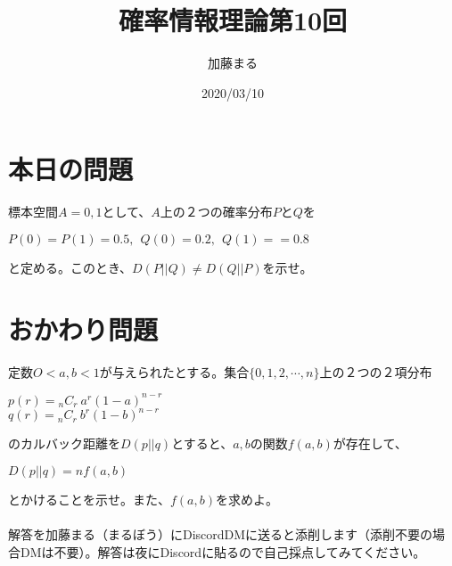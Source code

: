 \documentclass[a4j,uplatex,dvipdfmx]{jsarticle}
\title{確率情報理論第10回}
\author{加藤まる}
\date{2020/03/10}
\begin{document}
\maketitle

\section*{本日の問題}
標本空間$A={0,1}$として、$A$上の２つの確率分布$PとQ$を
\begin{center}
  $P(0)=P(1)=0.5,~~Q(0)=0.2,~~Q(1)==0.8$
\end{center}
と定める。このとき、$D(P||Q)\neq D(Q||P)$を示せ。


\section*{おかわり問題}
定数$O<a,b<1$が与えられたとする。集合$\{ 0,1,2,\cdots ,n \}$上の２つの２項分布
\begin{center}
  $p(r) = {}_nC_r~a^r (1-a)^{n-r}$\\
  $q(r) = {}_nC_r~b^r (1-b)^{n-r}$\\
\end{center}
のカルバック距離を$D(p||q)$とすると、$a,b$の関数$f(a,b)$が存在して、
\begin{center}
  $D(p||q)=nf(a,b)$
\end{center}
とかけることを示せ。また、$f(a,b)$を求めよ。\\
\\
解答を加藤まる（まるぼう）にDiscordDMに送ると添削します（添削不要の場合DMは不要）。解答は夜にDiscordに貼るので自己採点してみてください。
\end{document}
